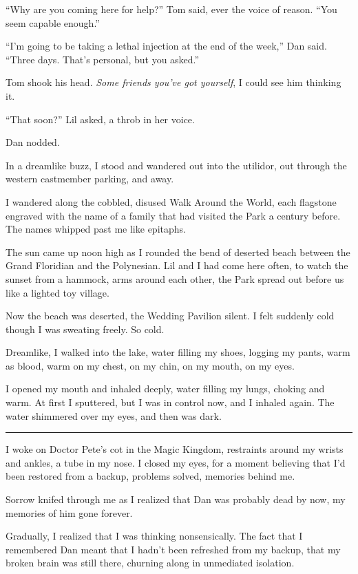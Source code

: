 “Why are you coming here for help?” Tom said, ever the voice of
reason. “You seem capable enough.”

“I'm going to be taking a lethal injection at the end of the week,”
Dan said. “Three days. That's personal, but you asked.”

Tom shook his head. \emph{Some friends you've got yourself}, I
could see him thinking it.

“That soon?” Lil asked, a throb in her voice.

Dan nodded.

In a dreamlike buzz, I stood and wandered out into the utilidor,
out through the western castmember parking, and away.

I wandered along the cobbled, disused Walk Around the World, each
flagstone engraved with the name of a family that had visited the
Park a century before. The names whipped past me like epitaphs.

The sun came up noon high as I rounded the bend of deserted beach
between the Grand Floridian and the Polynesian. Lil and I had come
here often, to watch the sunset from a hammock, arms around each
other, the Park spread out before us like a lighted toy village.

Now the beach was deserted, the Wedding Pavilion silent. I felt
suddenly cold though I was sweating freely. So cold.

Dreamlike, I walked into the lake, water filling my shoes, logging
my pants, warm as blood, warm on my chest, on my chin, on my mouth,
on my eyes.

I opened my mouth and inhaled deeply, water filling my lungs,
choking and warm. At first I sputtered, but I was in control now,
and I inhaled again. The water shimmered over my eyes, and then was
dark.

\begin{center}\rule{3in}{0.4pt}\end{center}

I woke on Doctor Pete's cot in the Magic Kingdom, restraints around
my wrists and ankles, a tube in my nose. I closed my eyes, for a
moment believing that I'd been restored from a backup, problems
solved, memories behind me.

Sorrow knifed through me as I realized that Dan was probably dead
by now, my memories of him gone forever.

Gradually, I realized that I was thinking nonsensically. The fact
that I remembered Dan meant that I hadn't been refreshed from my
backup, that my broken brain was still there, churning along in
unmediated isolation.

